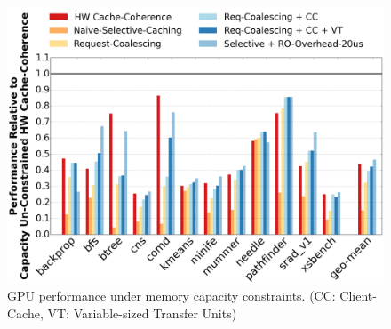 \begin{figure}[t]
\includegraphics[width=1.0\columnwidth]{hpca2016/figures/capacityconstrained.png}
\caption{GPU performance under memory capacity constraints. (CC: Client-Cache,
VT: Variable-sized Transfer Units)}
\label{fig:capacityconstrained}
\end{figure}

